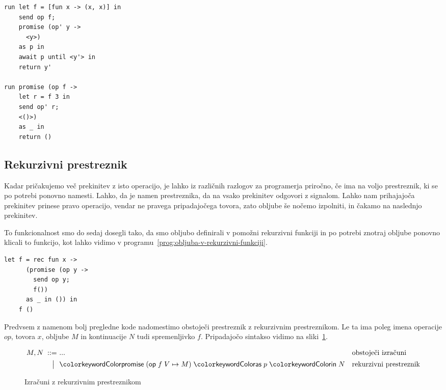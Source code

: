 \begin{lstlisting}[caption={Primer uporabe prenosljivega tipa.},label={prog:primer-prenosljivega-tipa},float,floatplacement=h]
run let f = [fun x -> (x, x)] in
    send op f;
    promise (op' y -> 
      <y>)
    as p in
    await p until <y'> in
    return y'

run promise (op f -> 
    let r = f 3 in
    send op' r;
    <()>) 
    as _ in
    return ()
\end{lstlisting}


\subsection{Rekurzivni prestreznik}


Kadar pričakujemo več prekinitev z isto operacijo, je lahko iz različnih razlogov za programerja priročno, če ima na voljo prestreznik, ki se po potrebi ponovno namesti. Lahko, da je namen prestreznika, da na vsako prekinitev odgovori z signalom. Lahko nam prihajajoča prekinitev prinese pravo operacijo, vendar ne pravega pripadajočega tovora, zato obljube še nočemo izpolniti, in čakamo na naslednjo prekinitev.

To funkcionalnost smo do sedaj dosegli tako, da smo obljubo definirali v pomožni rekurzivni funkciji in po potrebi znotraj obljube ponovno klicali to funkcijo, kot lahko vidimo v programu~\ref{prog:obljuba-v-rekurzivni-funkciji}.


\begin{lstlisting}[caption={Obljuba v rekurzivni funkciji.},label={prog:obljuba-v-rekurzivni-funkciji},float,floatplacement=h]
	let f = rec fun x ->
	  (promise (op y -> 
	    send op y;
	    f()) 
	  as _ in ()) in
	f ()
\end{lstlisting}

Predvsem z namenom bolj pregledne kode nadomestimo obstoječi prestreznik z rekurzivnim prestreznikom. Le ta ima poleg imena operacije $op$, tovora $x$, obljube $M$ in kontinuacije $N$ tudi spremenljivko $f$. Pripadajočo sintakso vidimo na sliki~\ref{fig:izrazi-prestreznik}.


\begin{figure}[h]
	\centering
	\small
	\begin{align*}
	M, N
	\bnfis& ...                            & &\text{obstoječi izračuni} \\
	\bnfor& \tmwithrec{op}{f}{V}{M}{p}{N}  & &\text{rekurzivni prestreznik}
	\end{align*}
 
	\caption{Izračuni z rekurzivnim prestreznikom}
	\label{fig:izrazi-prestreznik}
\end{figure}


